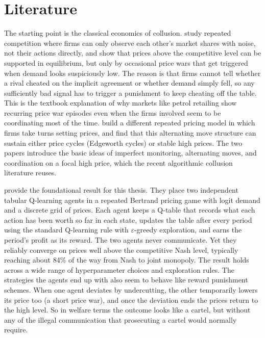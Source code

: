 \section{Literature}
\label{sec:literature}

The starting point is the classical economics of collusion. \citet{green1984} study repeated competition where firms can only observe each other's market shares with noise, not their actions directly, and show that prices above the competitive level can be supported in equilibrium, but only by occasional price wars that get triggered when demand looks suspiciously low. The reason is that firms cannot tell whether a rival cheated on the implicit agreement or whether demand simply fell, so any sufficiently bad signal has to trigger a punishment to keep cheating off the table. This is the textbook explanation of why markets like petrol retailing show recurring price war episodes even when the firms involved seem to be coordinating most of the time. \citet{maskin1988} build a different repeated pricing model in which firms take turns setting prices, and find that this alternating move structure can sustain either price cycles (Edgeworth cycles) or stable high prices. The two papers introduce the basic ideas of imperfect monitoring, alternating moves, and coordination on a focal high price, which the recent algorithmic collusion literature reuses.

\citet{calvano2020} provide the foundational result for this thesis. They place two independent tabular Q-learning agents \citep{watkins1992} in a repeated Bertrand pricing game with logit demand and a discrete grid of prices. Each agent keeps a Q-table that records what each action has been worth so far in each state, updates the table after every period using the standard Q-learning rule with $\varepsilon$-greedy exploration, and earns the period's profit as its reward. The two agents never communicate. Yet they reliably converge on prices well above the competitive Nash level, typically reaching about 84\% of the way from Nash to joint monopoly. The result holds across a wide range of hyperparameter choices and exploration rules. The strategies the agents end up with also seem to behave like reward punishment schemes. When one agent deviates by undercutting, the other temporarily lowers its price too (a short price war), and once the deviation ends the prices return to the high level. So in welfare terms the outcome looks like a cartel, but without any of the illegal communication that prosecuting a cartel would normally require.

